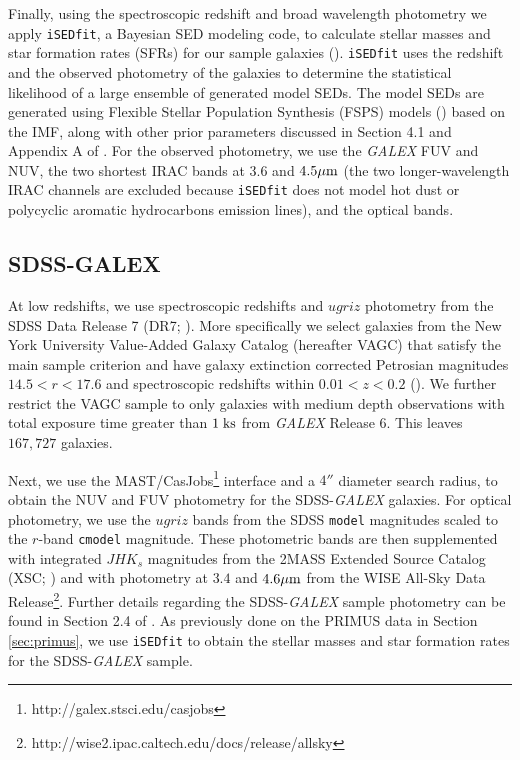 \documentclass{emulateapj}
\begin{document}
Finally, using the spectroscopic redshift and broad wavelength photometry we apply \texttt{iSEDfit}, a Bayesian SED modeling code, to calculate stellar masses and star formation rates (SFRs) for our sample galaxies (\citealt{Moustakas:2013aa}). \texttt{iSEDfit} uses the redshift and the observed photometry of the galaxies to determine the statistical likelihood of a large ensemble of generated model SEDs. The model SEDs are generated using Flexible Stellar Population Synthesis (FSPS) models (\citealt{Conroy:2010aa}) based on the \cite{Chabrier:2003aa} IMF, along with other prior parameters discussed in Section 4.1 and Appendix A of \cite{Moustakas:2013aa}. For the observed photometry, we use the {\em GALEX} FUV and NUV, the two shortest IRAC bands at $3.6$ and $4.5 \mu \rm{m}$ (the two longer-wavelength IRAC channels are excluded because \texttt{iSEDfit} does not model hot dust or polycyclic aromatic hydrocarbons emission lines), and the optical bands. 

\subsection{SDSS-GALEX} \label{sec:sdss}
At low redshifts, we use spectroscopic redshifts and $ugriz$ photometry from the SDSS Data Release 7 (DR7; \citealt{Abazajian:2009aa}). More specifically we select galaxies from the New York University Value-Added Galaxy Catalog (hereafter VAGC) that satisfy the main sample criterion and have galaxy extinction corrected Petrosian magnitudes $14.5 < r < 17.6$ and spectroscopic redshifts within $0.01 < z < 0.2$ (\citealt{Blanton:2005aa}). We further restrict the VAGC sample to only galaxies with medium depth observations with total exposure time greater than $1 \; \rm{ks}$ from {\em GALEX} Release 6. This leaves $167,727$ galaxies. 

Next, we use the MAST/CasJobs\footnote{http://galex.stsci.edu/casjobs} interface and a $4''$ diameter search radius, to obtain the NUV and FUV photometry for the SDSS-{\em GALEX} galaxies. For optical photometry, we use the $ugriz$ bands from the SDSS \texttt{model} magnitudes scaled to the $r$-band \texttt{cmodel} magnitude. These photometric bands are then supplemented with integrated $JHK_s$ magnitudes from the 2MASS Extended Source Catalog (XSC; \citealt{Jarrett:2000aa}) and with photometry at $3.4$ and $4.6 \mu \rm{m}$ from the WISE All-Sky Data Release\footnote{http://wise2.ipac.caltech.edu/docs/release/allsky}. Further details regarding the SDSS-{\em GALEX} sample photometry can be found in Section 2.4 of \cite{Moustakas:2013aa}. As previously done on the PRIMUS data in Section \ref{sec:primus}, we use \texttt{iSEDfit} to obtain the stellar masses and star formation rates for the SDSS-{\em GALEX} sample. 
\end{document}
